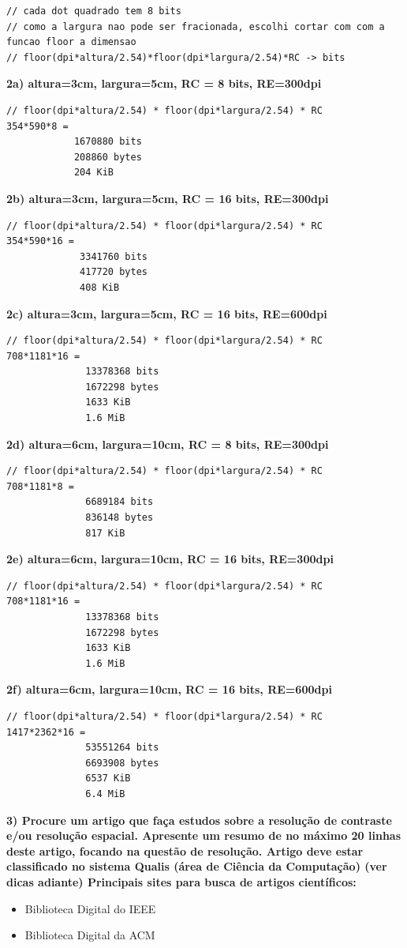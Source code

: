 \documentclass[a4paper]{sbgames}               %
\begin{document}
\begin{lstlisting}
// cada dot quadrado tem 8 bits
// como a largura nao pode ser fracionada, escolhi cortar com com a funcao floor a dimensao
// floor(dpi*altura/2.54)*floor(dpi*largura/2.54)*RC -> bits
\end{lstlisting}

\textbf{2a) altura=3cm, largura=5cm, RC = 8 bits, RE=300dpi
}\begin{lstlisting}
// floor(dpi*altura/2.54) * floor(dpi*largura/2.54) * RC
354*590*8 =
            1670880 bits
            208860 bytes
            204 KiB
\end{lstlisting}

\textbf{2b) altura=3cm, largura=5cm, RC = 16 bits, RE=300dpi}
\begin{lstlisting}
// floor(dpi*altura/2.54) * floor(dpi*largura/2.54) * RC
354*590*16 =
             3341760 bits
             417720 bytes
             408 KiB
\end{lstlisting}
\pagebreak
\textbf{2c) altura=3cm, largura=5cm, RC = 16 bits, RE=600dpi}
\begin{lstlisting}
// floor(dpi*altura/2.54) * floor(dpi*largura/2.54) * RC
708*1181*16 =
              13378368 bits
              1672298 bytes
              1633 KiB
              1.6 MiB
\end{lstlisting}

\textbf{2d) altura=6cm, largura=10cm, RC = 8 bits, RE=300dpi}
\begin{lstlisting}
// floor(dpi*altura/2.54) * floor(dpi*largura/2.54) * RC
708*1181*8 =
              6689184 bits
              836148 bytes
              817 KiB
\end{lstlisting}

\textbf{2e) altura=6cm, largura=10cm, RC = 16 bits, RE=300dpi}
\begin{lstlisting}
// floor(dpi*altura/2.54) * floor(dpi*largura/2.54) * RC
708*1181*16 =
              13378368 bits
              1672298 bytes
              1633 KiB
              1.6 MiB
\end{lstlisting}

\textbf{2f) altura=6cm, largura=10cm, RC = 16 bits, RE=600dpi}
\begin{lstlisting}
// floor(dpi*altura/2.54) * floor(dpi*largura/2.54) * RC
1417*2362*16 =
              53551264 bits
              6693908 bytes
              6537 KiB
              6.4 MiB
\end{lstlisting}

\textbf{3) Procure um artigo que faça estudos sobre a resolução de contraste e/ou resolução espacial. Apresente um resumo de no máximo 20 linhas deste artigo, focando na questão de resolução. Artigo deve estar classificado no sistema Qualis (área de Ciência da Computação) (ver dicas adiante) Principais sites para busca de artigos científicos:}
\begin{itemize}
\item Biblioteca Digital do IEEE
\item Biblioteca Digital da ACM
\end{itemize}
\end{document}
